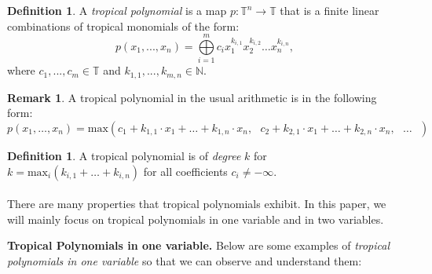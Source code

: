 \documentclass[]{article}
\theoremstyle{definition}
\numberwithin{equation}{section}
\newtheorem{defn}[thm]{Definition}
\newtheorem{rmk}[thm]{Remark}
\renewcommand{\.}{\,.}
\begin{document}
	
	\begin{defn} A \emph{tropical polynomial} is a map  $p:\mathbb{T}^n\to\mathbb{T}$ that is a finite linear combinations of tropical monomials of the form: 
	\begin{equation} p(x_1,...,x_n)=\bigoplus\limits_{i=1}^m{} c_ix_1^{k_{i,1}}x_2^{k_{i,2}} \ldots x_n^{k_{i,n}},
	\end{equation}
	where $c_1,...,c_m\in \mathbb{T}$ and $k_{1,1},...,k_{m,n} \in  \mathbb{N}$.
	  \end{defn}

	\begin{rmk}
		A tropical polynomial in the usual arithmetic is in the following form:
		\begin{equation} \label{eq:1}
			p(x_1,\ldots,x_n)=\textrm{max}(c_1+k_{1,1}\cdot x_1+\ldots+k_{1,n}\cdot x_n,\textrm{ } c_2+k_{2,1}\cdot x_1+\ldots+k_{2,n}\cdot x_n,\textrm{ } \ldots\textrm{ })
		\end{equation}
	\end{rmk}
\begin{defn}\label{degree} A tropical polynomial is of \emph{degree} $k$ for $k=\textrm{max}_i(k_{i,1}+\ldots+k_{i,n})$ for all coefficients $c_i\neq-\infty$. \\ \\ \hspace{-4mm}
   There are many properties that tropical polynomials exhibit. In this paper, we will mainly focus on tropical polynomials in one variable and in two variables.
	\end{defn}  \vspace{-2mm}
   \hspace{3mm} \textbf{Tropical Polynomials in one variable.}  Below are some examples of \emph{tropical polynomials in one variable} so that we can observe and understand them:
\end{document}
